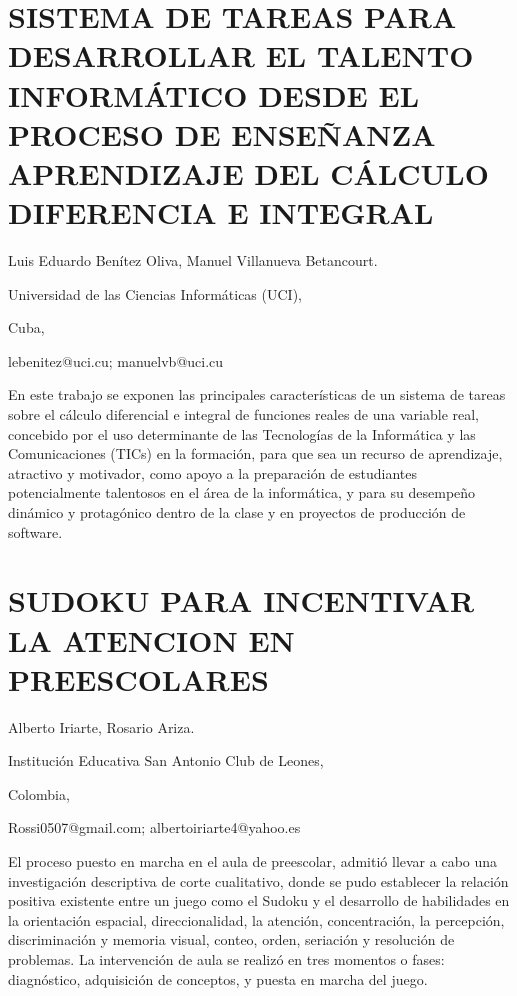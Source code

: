 \section{SISTEMA DE TAREAS PARA DESARROLLAR EL TALENTO INFORMÁTICO DESDE EL
PROCESO DE ENSEÑANZA APRENDIZAJE DEL CÁLCULO DIFERENCIA E INTEGRAL}

\begin{datos}

Luis Eduardo Benítez Oliva, Manuel Villanueva Betancourt.

Universidad de las Ciencias Informáticas (UCI),

Cuba,

lebenitez@uci.cu; manuelvb@uci.cu 

\end{datos}

En este trabajo se exponen las principales características de un sistema
de tareas sobre el cálculo diferencial e integral de funciones reales
de una variable real, concebido por el uso determinante de las Tecnologías
de la Informática y las Comunicaciones (TICs) en la formación, para
que sea un recurso de aprendizaje, atractivo y motivador, como apoyo
a la preparación de estudiantes potencialmente talentosos en el área
de la informática, y para su desempeño dinámico y protagónico dentro
de la clase y en proyectos de producción de software.


\section{SUDOKU PARA INCENTIVAR LA ATENCION EN PREESCOLARES }

\begin{datos}

Alberto Iriarte, Rosario Ariza.

Institución Educativa San Antonio Club de Leones, 

Colombia,

Rossi0507@gmail.com; albertoiriarte4@yahoo.es 

\end{datos}

El proceso puesto en marcha en el aula de preescolar, admitió llevar
a cabo una investigación descriptiva de corte cualitativo, donde se
pudo establecer la relación positiva existente entre un juego como
el Sudoku y el desarrollo de habilidades en la orientación espacial,
direccionalidad, la atención, concentración, la percepción, discriminación
y memoria visual, conteo, orden, seriación y resolución de problemas.
La intervención de aula se realizó en tres momentos o fases: diagnóstico,
adquisición de conceptos, y puesta en marcha del juego. 



